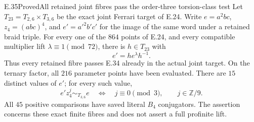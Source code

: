 \begin{statement}{E.35}{Proved}{All retained joint fibres pass the order-three torsion-class test}
Let $T_{23}=T_{2,6}\times T_{3,6}$ be the exact joint
Ferrari target of E.24. Write
$e=a^2bc$, $z_4=(abc)^4$, and
$e'=a'^2b'c'$ for the image of the same word under a
retained braid triple. For every one of the $864$
points of E.24, and every compatible multiplier lift
$\lambda\equiv1\pmod{72}$, there is $h\in T_{23}$ with
\[
                         e'=he^\lambda h^{-1}.
 \tag{E.35.1}
\]
Thus every retained fibre passes E.34 already in the
actual joint target. On the ternary factor, all $216$
parameter points have been evaluated. There are $15$
distinct values of $e'$; for every such value,
\[
 e'z_4^j\sim_{T_{3,6}}e
              \quad\Longleftrightarrow\quad j\equiv0\pmod3,
             \qquad j\in\mathbb Z/9.
 \tag{E.35.2}
\]
All $45$ positive comparisons have saved literal
$B_4$ conjugators. The assertion concerns these exact
finite fibres and does not assert a full profinite lift.
\end{statement}
